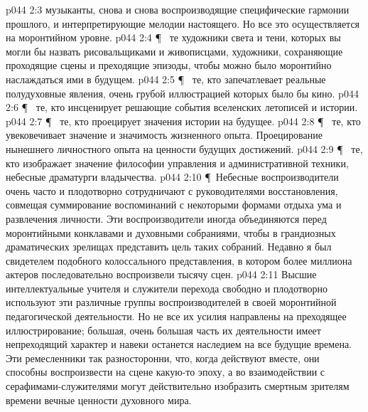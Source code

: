 \vs p044 2:3 \bibnobreakspace {} музыканты, снова и снова воспроизводящие специфические гармонии прошлого, и интерпретирующие мелодии настоящего. Но все это осуществляется на моронтийном уровне.
\vs p044 2:4 \P\ \bibnobreakspace {} те художники света и тени, которых вы могли бы назвать рисовальщиками и живописцами, художники, сохраняющие проходящие сцены и преходящие эпизоды, чтобы можно было моронтийно наслаждаться ими в будущем.
\vs p044 2:5 \P\ \bibnobreakspace {} те, кто запечатлевает реальные полудуховные явления, очень грубой иллюстрацией которых было бы кино.
\vs p044 2:6 \P\ \bibnobreakspace {} те, кто инсценирует решающие события вселенских летописей и истории.
\vs p044 2:7 \P\ \bibnobreakspace {} те, кто проецирует значения истории на будущее.
\vs p044 2:8 \P\ \bibnobreakspace {} те, кто увековечивает значение и значимость жизненного опыта. Проецирование нынешнего личностного опыта на ценности будущих достижений.
\vs p044 2:9 \P\ \bibnobreakspace {} те, кто изображает значение философии управления и административной техники, небесные драматурги владычества.
\vs p044 2:10 \P\ Небесные воспроизводители очень часто и плодотворно сотрудничают с руководителями восстановления, совмещая суммирование воспоминаний с некоторыми формами отдыха ума и развлечения личности. Эти воспроизводители иногда объединяются перед моронтийными конклавами и духовными собраниями, чтобы в грандиозных драматических зрелищах представить цель таких собраний. Недавно я был свидетелем подобного колоссального представления, в котором более миллиона актеров последовательно воспроизвели тысячу сцен.
\vs p044 2:11 Высшие интеллектуальные учителя и служители перехода свободно и плодотворно используют эти различные группы воспроизводителей в своей моронтийной педагогической деятельности. Но не все их усилия направлены на преходящее иллюстрирование; большая, очень большая часть их деятельности имеет непреходящий характер и навеки останется наследием на все будущие времена. Эти ремесленники так разносторонни, что, когда действуют вместе, они способны воспроизвести на сцене какую\hyp{}то эпоху, а во взаимодействии с серафимами\hyp{}служителями могут действительно изобразить смертным зрителям времени вечные ценности духовного мира.
